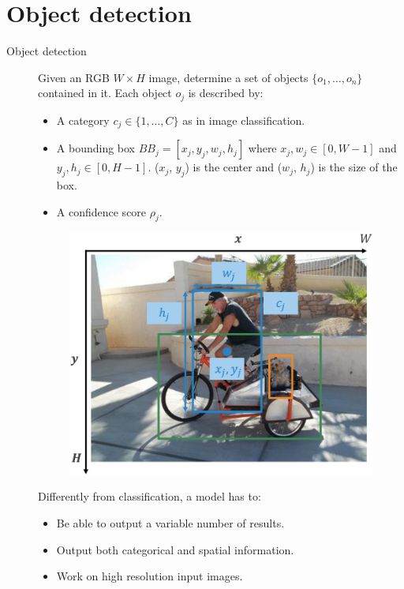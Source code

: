 \chapter{Object detection}


\begin{description}
    \item[Object detection] 
        Given an RGB $W \times H$ image, determine a set of objects $\{ o_1, \dots, o_n \}$ contained in it. Each object $o_j$ is described by:
        \begin{itemize}
            \item A category $c_j \in \{ 1, \dots, C \}$ as in image classification.
            \item A bounding box $BB_j = [ x_j, y_j, w_j, h_j ]$ where $x_j, w_j \in [0, W-1]$ and $y_j, h_j \in [0, H-1]$. ($x_j$, $y_j$) is the center and ($w_j$, $h_j$) is the size of the box.
            \item A confidence score $\rho_j$.
        \end{itemize}

        \begin{figure}[H]
            \centering
            \includegraphics[width=0.45\linewidth]{./img/_object_detection_example.pdf}
        \end{figure}

        \begin{remark}
            Differently from classification, a model has to:
            \begin{itemize}
                \item Be able to output a variable number of results.
                \item Output both categorical and spatial information.
                \item Work on high resolution input images.
            \end{itemize}
        \end{remark}
\end{description}



